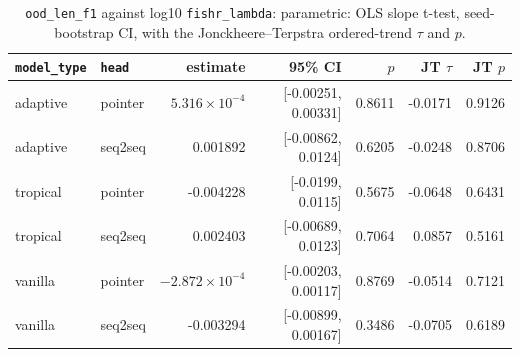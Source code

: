\documentclass[10pt]{article}
\begin{document}
{\small
\begin{longtable}{llrrrrr}
\caption{\texttt{ood\_len\_f1} against log10 \texttt{fishr\_lambda}: parametric: OLS slope t-test, seed-bootstrap CI, with the Jonckheere--Terpstra ordered-trend $\tau$ and $p$.}\label{tab:trend-ood_len_f1}\\
\toprule
\texttt{model\_type} & \texttt{head} & estimate & 95\% CI & $p$ & JT $\tau$ & JT $p$\\
\midrule
\endhead
adaptive & pointer & $5.316\times10^{-4}$ & [-0.00251, 0.00331] & 0.8611 & -0.0171 & 0.9126\\
adaptive & seq2seq & 0.001892 & [-0.00862, 0.0124] & 0.6205 & -0.0248 & 0.8706\\
tropical & pointer & -0.004228 & [-0.0199, 0.0115] & 0.5675 & -0.0648 & 0.6431\\
tropical & seq2seq & 0.002403 & [-0.00689, 0.0123] & 0.7064 & 0.0857 & 0.5161\\
vanilla & pointer & $-2.872\times10^{-4}$ & [-0.00203, 0.00117] & 0.8769 & -0.0514 & 0.7121\\
vanilla & seq2seq & -0.003294 & [-0.00899, 0.00167] & 0.3486 & -0.0705 & 0.6189\\
\bottomrule
\end{longtable}
}
\end{document}
